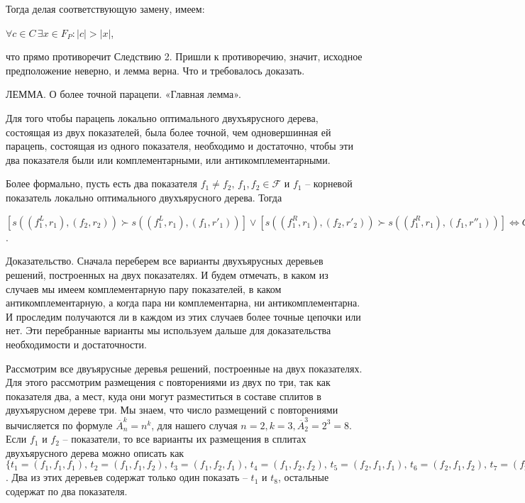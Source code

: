 \documentclass[12pt]{a&t}
\begin{document}
Тогда делая соответствующую замену, имеем:

$\forall c \in C \, \exists x \in F_P : |c| > |x| $,

что прямо противоречит Следствию 2. Пришли к противоречию, значит, исходное предположение неверно, и лемма верна. Что и требовалось доказать.

ЛЕММА. О более точной парацепи. «Главная лемма».

Для того чтобы парацепь локально оптимального двухъярусного дерева, состоящая из двух показателей, была более точной, чем одновершинная ей парацепь, состоящая из одного показателя, необходимо и достаточно, чтобы эти два показателя были или комплементарными, или антикомплементарными.

Более формально, пусть есть два показателя $ f_1 \neq f_2, \, f_1, f_2 \in \mathscr{F} $ и $f_1$ -- корневой показатель локально оптимального двухъярусного дерева. Тогда

$[s((f_1^L, r_1), (f_2, r_2)) \succ s((f_1^L, r_1), (f_1, r'_1))] \lor [s((f_1^R, r_1), (f_2, r'_2)) \succ s((f_1^R, r_1), (f_1, r''_1))] \Leftrightarrow Q(\{f_1, f_2 \}) \lor \widetilde{Q}(\{f_1, f_2 \}) $.


Доказательство. Сначала переберем все варианты двухъярусных деревьев решений, построенных на двух показателях. И будем отмечать, в каком из случаев мы имеем комплементарную пару показателей, в каком антикомплементарную, а когда пара ни комплементарна, ни антикомплементарна. И проследим получаются ли в каждом из этих случаев более точные цепочки или нет. Эти перебранные варианты мы используем дальше для доказательства необходимости и достаточности. 

Рассмотрим все двуъярусные деревья решений, построенные на двух показателях. Для этого рассмотрим размещения с повторениями из двух по три, так как показателя два, а мест, куда они могут разместиться в составе сплитов в двухъярусном дереве три. Мы знаем, что число размещений с повторениями вычисляется по формуле $ \overline{A}_n^k = n^k $, для нашего случая $ n = 2, k = 3, \overline{A}_2^3 = 2^3 = 8 $.  Если $ f_1$ и $f_2 $ -- показатели, то все варианты их размещения в сплитах двухъярусного дерева можно описать как $ \{t_1 = (f_1, f_1, f_1), \, t_2 = (f_1, f_1, f_2), \, t_3 = (f_1, f_2, f_1), \, t_4 = (f_1, f_2, f_2), \, t_5 = (f_2, f_1, f_1), \, t_6 = (f_2, f_1, f_2), \, t_7 = (f_2, f_2, f_1), \, t_8 = (f_2, f_2, f_2)  \} $ . Два из этих деревьев содержат только один показать -- $t_1$ и $t_8$, остальные содержат по два показателя. 
\end{document}
